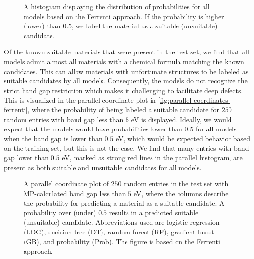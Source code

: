 \begin{figure}[ht!]
    \centering
    
    \vspace*{-130mm}
    \caption{A histogram displaying the distribution of probabilities for all models based on the Ferrenti approach. If the probability is higher (lower) than $0.5$, we label the material as a suitable (unsuitable) candidate.}
    \label{fig:histogram-ferrenti}
\end{figure}

\noindent Of the known suitable materials that were present in the test set, we find that all models admit almost all materials with a chemical formula matching the known candidates.
This can allow materials with unfortunate structures to be labeled as suitable candidates by all models. Consequently, the models do not recognize the strict band gap restriction which makes it challenging to facilitate deep defects. This is visualized in the parallel coordinate plot in \autoref{fig:parallel-coordinates-ferrenti}, where the probability of being labeled a suitable candidate for $250$ random entries with band gap less than $5$ eV is displayed.
Ideally, we would expect that the models would have probabilities lower than $0.5$ for all models when the band gap is lower than $0.5$ eV, which would be expected behavior based on the training set, but this is not the case. We find that many entries with band gap lower than $0.5$ eV, marked as strong red lines in the parallel histogram, are present as both suitable and unsuitable candidates for all models. %


\begin{figure}[ht!]
    \centering
    
    \vspace*{-130mm}
    \caption{A parallel coordinate plot of $250$ random entries in the test set with MP-calculated band gap less than $5$ eV, where the columns describe the probability for predicting a material as a suitable candidate. A probability over (under) $0.5$ results in a predicted suitable (unsuitable) candidate. Abbreviations used are logistic regression (LOG), decision tree (DT), random forest (RF), gradient boost (GB), and probability (Prob). The figure is based on the Ferrenti approach.}
    \label{fig:parallel-coordinates-ferrenti}
\end{figure}

